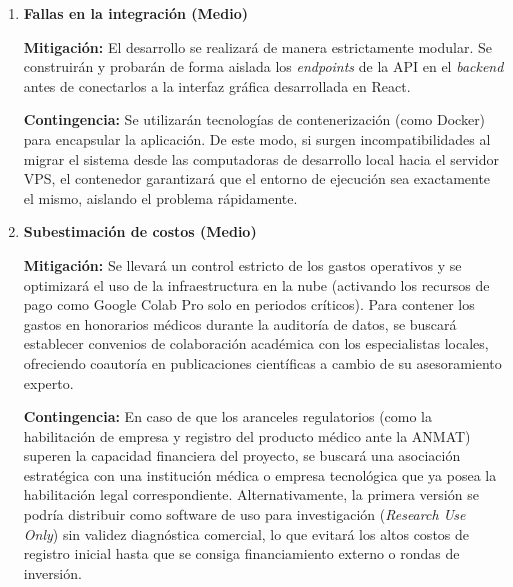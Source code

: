 \begin{enumerate}[label=\textbf{R\arabic* - }]
                    \textbf{Contingencia:} Si un único centro médico no logra alcanzar la cuota de imágenes necesarias en el tiempo estimado, se ampliará inmediatamente la solicitud de colaboración a otras clínicas oftalmológicas o centros de alta complejidad ubicados en los principales núcleos urbanos de la provincia de Misiones (como Posadas, Oberá y Eldorado).
                
                \item \textbf{Fallas en la integración (Medio)}
    
                    \textbf{Mitigación:} El desarrollo se realizará de manera estrictamente modular. Se construirán y probarán de forma aislada los \textit{endpoints} de la API en el \textit{backend} antes de conectarlos a la interfaz gráfica desarrollada en React.
    
                    \textbf{Contingencia:} Se utilizarán tecnologías de contenerización (como Docker) para encapsular la aplicación. De este modo, si surgen incompatibilidades al migrar el sistema desde las computadoras de desarrollo local hacia el servidor VPS, el contenedor garantizará que el entorno de ejecución sea exactamente el mismo, aislando el problema rápidamente.
                       
                \item \textbf{Subestimación de costos (Medio)}
    
                    \textbf{Mitigación:} Se llevará un control estricto de los gastos operativos y se optimizará el uso de la infraestructura en la nube (activando los recursos de pago como Google Colab Pro solo en periodos críticos). Para contener los gastos en honorarios médicos durante la auditoría de datos, se buscará establecer convenios de colaboración académica con los especialistas locales, ofreciendo coautoría en publicaciones científicas a cambio de su asesoramiento experto.
    
                    \textbf{Contingencia:} En caso de que los aranceles regulatorios (como la habilitación de empresa y registro del producto médico ante la ANMAT) superen la capacidad financiera del proyecto, se buscará una asociación estratégica con una institución médica o empresa tecnológica que ya posea la habilitación legal correspondiente. Alternativamente, la primera versión se podría distribuir como software de uso para investigación (\textit{Research Use Only}) sin validez diagnóstica comercial, lo que evitará los altos costos de registro inicial hasta que se consiga financiamiento externo o rondas de inversión.
                    
            \end{enumerate}

